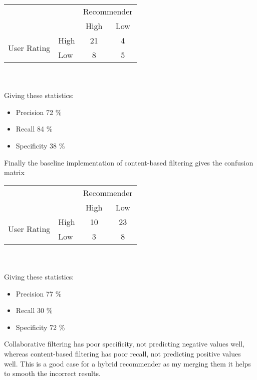 \documentclass[conference]{IEEEtran}
\begin{document}
\begin{tabular}{l|l|c|c|}
    \multicolumn{2}{c}{}         & \multicolumn{2}{c}{Recommender}           \\
    \cline{3-4}
    \multicolumn{2}{c|}{}        & High                            & Low     \\
    \cline{2-4}
    \multirow{2}{*}{User Rating} & High                            & 21  & 4 \\
    \cline{2-4}
                                 & Low                             & 8   & 5 \\
    \cline{2-4}
\end{tabular}
\\
\\
Giving these statistics:
\begin{itemize}
    \item Precision 72 \%
    \item Recall 84 \%
    \item Specificity 38 \%
\end{itemize}

Finally the baseline implementation of content-based filtering gives the confusion matrix
\begin{tabular}{l|l|c|c|}
    \multicolumn{2}{c}{}         & \multicolumn{2}{c}{Recommender}            \\
    \cline{3-4}
    \multicolumn{2}{c|}{}        & High                            & Low      \\
    \cline{2-4}
    \multirow{2}{*}{User Rating} & High                            & 10  & 23 \\
    \cline{2-4}
                                 & Low                             & 3   & 8  \\
    \cline{2-4}
\end{tabular}
\\
\\
Giving these statistics:
\begin{itemize}
    \item Precision 77 \%
    \item Recall 30 \%
    \item Specificity 72 \%
\end{itemize}

Collaborative filtering has poor specificity, not predicting negative values well, whereas content-based filtering has poor recall, not predicting positive values well. This is a good case for a hybrid recommender as my merging them it helps to smooth the incorrect results.
\end{document}
